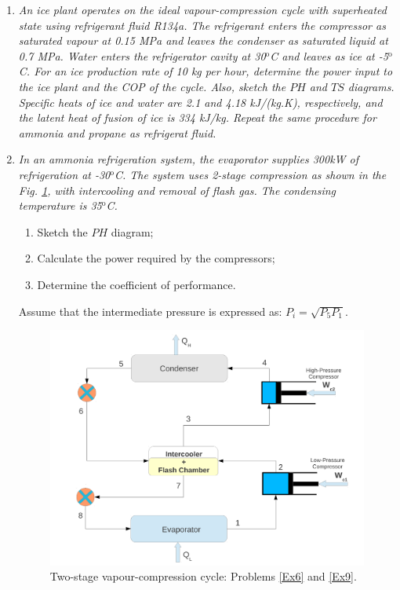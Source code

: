 \begin{enumerate}
\item \label{Ex5} {\it An ice plant operates on the ideal vapour-compression cycle with superheated state using refrigerant fluid R134a.  The refrigerant enters the compressor as saturated vapour at 0.15 MPa and leaves the condenser as saturated liquid at 0.7 MPa.  Water enters the refrigerator cavity at 30$^{\text{o}}$C and leaves as ice at -5$^{\text{o}}$C. For an ice production rate of 10 kg per hour, determine the power input to the ice plant and the COP of the cycle. Also, sketch the $PH$ and $TS$ diagrams. Specific heats of ice and water are 2.1 and 4.18 kJ/(kg.K), respectively, and the latent heat of fusion of ice is 334 kJ/kg. Repeat the same procedure for ammonia and propane as refrigerat fluid.}


\item \label{Ex6} {\it In an ammonia refrigeration system, the evaporator supplies 300kW of refrigeration at -30$^{\text{o}}$C.  The system uses 2-stage compression as shown in the Fig. \ref{fig:ex6}, with intercooling and removal of flash gas.  The condensing temperature is 35$^{\text{o}}$C.
    \begin{enumerate}
     \item Sketch the $PH$ diagram;
     \item Calculate the power required by the compressors;
     \item Determine the coefficient of performance.
    \end{enumerate}

Assume that the intermediate pressure is expressed as: $P_{i}=\sqrt{P_{5}P_{1}}$.}
   \begin{figure}[h]
    \begin{center}
     \includegraphics[width=10.cm,height=10.cm,clip]{./Pics/Overview_Refrig30}
    \end{center}
     \caption{Two-stage vapour-compression cycle: Problems \ref{Ex6} and \ref{Ex9}.} \label{fig:ex6} 
  \end{figure}  



\end{enumerate}
